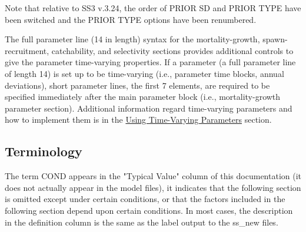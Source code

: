 Note that relative to SS3 v.3.24,  the order of PRIOR SD and PRIOR TYPE have been switched and the PRIOR TYPE options have been renumbered.

The full parameter line (14 in length) syntax for the mortality-growth, spawn-recruitment, catchability, and selectivity sections provides additional controls to give the parameter time-varying properties.  If a parameter (a full parameter line of length 14) is set up to be time-varying (i.e., parameter time blocks, annual deviations), short parameter lines, the first 7 elements, are required to be specified immediately after the main parameter block (i.e., mortality-growth parameter section).  Additional information regard time-varying parameters and how to implement them is in the \hyperlink{TVpara}{Using Time-Varying Parameters} section.


\subsection{Terminology}
The term COND appears in the "Typical Value" column of this documentation (it does not actually appear in the model files), it indicates that the following section is omitted except under certain conditions, or that the factors included in the following section depend upon certain conditions. In most cases, the description in the definition column is the same as the label output to the ss\_new files.

